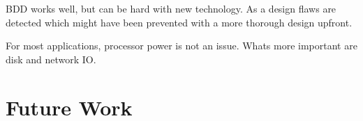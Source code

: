 
BDD works well, but can be hard with new technology. As a design flaws are
detected which might have been prevented with a more thorough design upfront.

For most applications, processor power is not an issue. Whats more important
are disk and network IO.

\section{Future Work}
